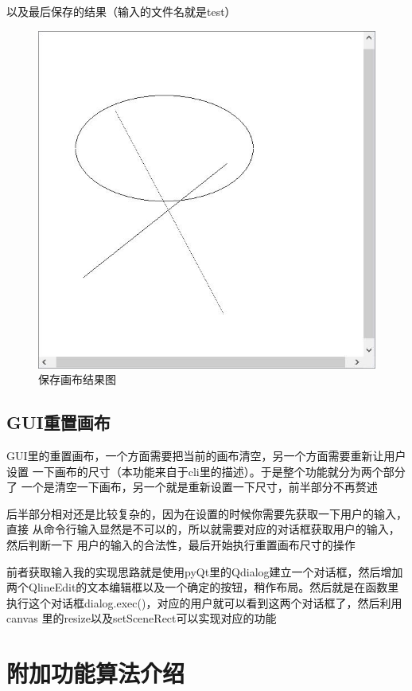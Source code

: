 \documentclass[a4paper,UTF8]{article}
\theoremstyle{definition}
\begin{document}
以及最后保存的结果（输入的文件名就是test）
\begin{figure}[h]
	\centering
	\includegraphics[scale=0.5]{figure/test.jpg}
	\caption{保存画布结果图}
	\label{fig:SaveCanvas}
\end{figure}

\subsection{GUI重置画布}
GUI里的重置画布，一个方面需要把当前的画布清空，另一个方面需要重新让用户设置
一下画布的尺寸（本功能来自于cli里的描述）。于是整个功能就分为两个部分了
一个是清空一下画布，另一个就是重新设置一下尺寸，前半部分不再赘述

后半部分相对还是比较复杂的，因为在设置的时候你需要先获取一下用户的输入，直接
从命令行输入显然是不可以的，所以就需要对应的对话框获取用户的输入，然后判断一下
用户的输入的合法性，最后开始执行重置画布尺寸的操作

前者获取输入我的实现思路就是使用pyQt里的Qdialog建立一个对话框，然后增加
两个QlineEdit的文本编辑框以及一个确定的按钮，稍作布局。然后就是在函数里
执行这个对话框dialog.exec()，对应的用户就可以看到这两个对话框了，然后利用canvas
里的resize以及setSceneRect可以实现对应的功能

\section{附加功能算法介绍}
\end{document}

